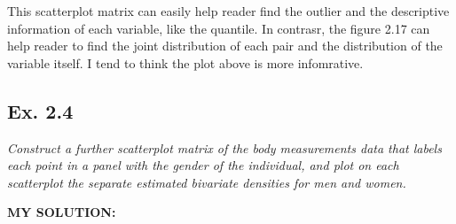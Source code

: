 \documentclass[
]{article}
\newenvironment{Shaded}{\begin{snugshade}}{\end{snugshade}}
\newcommand{\AttributeTok}[1]{\textcolor[rgb]{0.77,0.63,0.00}{#1}}
\newcommand{\CommentTok}[1]{\textcolor[rgb]{0.56,0.35,0.01}{\textit{#1}}}
\newcommand{\ConstantTok}[1]{\textcolor[rgb]{0.00,0.00,0.00}{#1}}
\newcommand{\ControlFlowTok}[1]{\textcolor[rgb]{0.13,0.29,0.53}{\textbf{#1}}}
\newcommand{\DecValTok}[1]{\textcolor[rgb]{0.00,0.00,0.81}{#1}}
\newcommand{\FunctionTok}[1]{\textcolor[rgb]{0.00,0.00,0.00}{#1}}
\newcommand{\NormalTok}[1]{#1}
\newcommand{\OtherTok}[1]{\textcolor[rgb]{0.56,0.35,0.01}{#1}}
\newcommand{\SpecialCharTok}[1]{\textcolor[rgb]{0.00,0.00,0.00}{#1}}
\newcommand{\StringTok}[1]{\textcolor[rgb]{0.31,0.60,0.02}{#1}}
\begin{document}
This scatterplot matrix can easily help reader find the outlier and the
descriptive information of each variable, like the quantile. In
contrasr, the figure 2.17 can help reader to find the joint distribution
of each pair and the distribution of the variable itself. I tend to
think the plot above is more infomrative.

\hypertarget{ex.-2.4}{%
\subsection{Ex. 2.4}\label{ex.-2.4}}

\emph{Construct a further scatterplot matrix of the body measurements
data that labels each point in a panel with the gender of the
individual, and plot on each scatterplot the separate estimated
bivariate densities for men and women.}

\textbf{MY SOLUTION:}

\begin{Shaded}
\end{Shaded}
\end{document}
